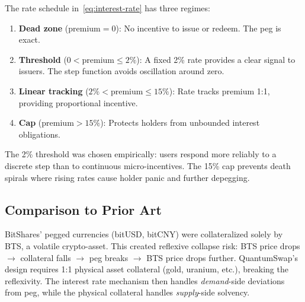 The rate schedule in~\eqref{eq:interest-rate} has three regimes:

\begin{enumerate}[nosep]
  \item \textbf{Dead zone} ($\text{premium} = 0$): No incentive to
        issue or redeem. The peg is exact.
  \item \textbf{Threshold} ($0 < \text{premium} \leq 2\%$): A fixed
        2\% rate provides a clear signal to issuers. The step function
        avoids oscillation around zero.
  \item \textbf{Linear tracking} ($2\% < \text{premium} \leq 15\%$):
        Rate tracks premium 1:1, providing proportional incentive.
  \item \textbf{Cap} ($\text{premium} > 15\%$): Protects holders from
        unbounded interest obligations.
\end{enumerate}

\begin{remark}
The 2\% threshold was chosen empirically: users respond more
reliably to a discrete step than to continuous micro-incentives. The
15\% cap prevents death spirals where rising rates cause holder panic
and further depegging.
\end{remark}

\subsection{Comparison to Prior Art}

BitShares' pegged currencies (bitUSD, bitCNY) were collateralized
solely by BTS, a volatile crypto-asset. This created reflexive
collapse risk: BTS price drops $\rightarrow$ collateral falls
$\rightarrow$ peg breaks $\rightarrow$ BTS price drops further.
QuantumSwap's design requires 1:1 physical asset collateral (gold,
uranium, etc.), breaking the reflexivity. The interest rate mechanism
then handles \emph{demand}-side deviations from peg, while the
physical collateral handles \emph{supply}-side solvency.

